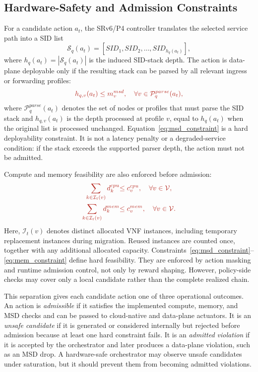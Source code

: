 \documentclass[final,5p]{elsarticle}
\newcommand{\rev}[1]{\textcolor{BrickRed}{#1}}
\begin{document}
\subsection{Hardware-Safety and Admission Constraints}
\label{subsec:hardware_constraint_model}

For a candidate action \(a_t\), the SRv6/P4 controller translates the selected service path into a SID list
\begin{equation}
\mathcal{S}_q(a_t)=[SID_1,SID_2,\ldots,SID_{h_q(a_t)}],
\end{equation}
where \(h_q(a_t)=|\mathcal{S}_q(a_t)|\) is the induced SID-stack depth. The action is data-plane deployable only if the resulting stack can be parsed by all relevant ingress or forwarding profiles:
\begin{equation}
\rev{h_{q,v}(a_t)\le m_v^{msd},\quad\forall v\in\mathcal{P}^{parse}_q(a_t),}
\label{eq:msd_constraint}
\end{equation}
where \(\mathcal{P}^{parse}_q(a_t)\) denotes the set of nodes or profiles that must parse the SID stack \rev{and \(h_{q,v}(a_t)\) is the depth processed at profile \(v\), equal to \(h_q(a_t)\) when the original list is processed unchanged}. Equation~\eqref{eq:msd_constraint} is a hard deployability constraint. It is not a latency penalty or a degraded-service condition: if the stack exceeds the supported parser depth, the action must not be admitted.

Compute and memory feasibility are also enforced before admission:
\begin{align}
\rev{\sum_{k\in\mathcal{I}_t(v)}d_k^{cpu}}&\rev{\le c_v^{cpu},\quad\forall v\in\mathcal{V},}\label{eq:cpu_constraint}\\
\rev{\sum_{k\in\mathcal{I}_t(v)}d_k^{mem}}&\rev{\le c_v^{mem},\quad\forall v\in\mathcal{V}.}\label{eq:mem_constraint}
\end{align}
\rev{Here, \(\mathcal{I}_t(v)\) denotes distinct allocated VNF instances, including temporary replacement instances during migration. Reused instances are counted once, together with any additional allocated capacity.} Constraints~\eqref{eq:msd_constraint}--\eqref{eq:mem_constraint} define hard feasibility. They are enforced by action masking and runtime admission control, not only by reward shaping. \rev{However, policy-side checks may cover only a local candidate rather than the complete realized chain.}

This separation gives each candidate action one of three operational outcomes. An action is \textit{admissible} if it satisfies \rev{the implemented} compute, memory, and MSD \rev{checks} and can be passed to cloud-native and data-plane actuators. It is an \textit{unsafe candidate} if it is generated or considered internally but rejected before admission because at least one hard constraint fails. It is an \textit{admitted violation} if it is accepted by the orchestrator and later produces a data-plane violation, such as an MSD drop. A hardware-safe orchestrator may observe unsafe candidates under saturation, but it should prevent them from becoming admitted violations.
\end{document}
